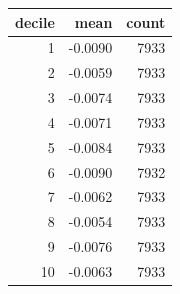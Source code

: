 \begin{tabular}{rrr}
\toprule
decile & mean & count \\
\midrule
1 & -0.0090 & 7933 \\
2 & -0.0059 & 7933 \\
3 & -0.0074 & 7933 \\
4 & -0.0071 & 7933 \\
5 & -0.0084 & 7933 \\
6 & -0.0090 & 7932 \\
7 & -0.0062 & 7933 \\
8 & -0.0054 & 7933 \\
9 & -0.0076 & 7933 \\
10 & -0.0063 & 7933 \\
\bottomrule
\end{tabular}
